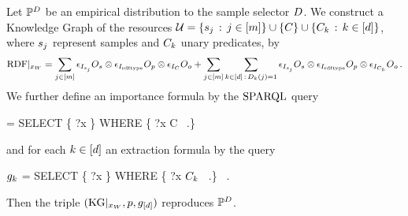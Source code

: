 \begin{theorem}
    \label{the:reproducingKGSingelObjects}
    Let $\mathbb{P}^{D}$ be an empirical distribution to the sample selector $D$.
    We construct a Knowledge Graph of the resources $\mathcal{U} = \{s_j \,:\, j\in[m]\} \cup \{C\} \cup \{C_k \,:\, k\in[d]\}$, where $s_{j}$ represent samples and $C_k$ unary predicates, by
    \begin{align*}
        {\mathrm{RDF}}|_{x_{W}}
        =
        \sum_{j\in[m]}
        \epsilon_{I_{s_j}}{O_{s}}
        \otimes \epsilon_{I_{\mathrm{rdf}\mathrm{type}}}{O_{p}}
        \otimes \epsilon_{I_{C}}{O_{o}}
        +
        \sum_{j\in[m]} \sum_{k\in[d] \,:\, D_{k}(j)=1}
        \epsilon_{I_{s_j}}{O_{s}}
        \otimes \epsilon_{I_{\mathrm{rdf}\mathrm{type}}}{O_{p}}
        \otimes \epsilon_{I_{C_k}}{O_{o}} \, .
    \end{align*}
    We further define an importance formula by the $\mathrm{SPARQL}$ query
    \begin{centeredscript}
        \impformula = SELECT \{ ?x \} WHERE \{ ?x \quad \rdftype\quad C \, .\}
    \end{centeredscript}
    and for each $k\in[d]$ an extraction formula by the query
    \begin{centeredscript}
        $g_{k}$ = SELECT \{ ?x \} WHERE \{ ?x \quad \rdftype \quad $C_k$ \, .\} \, .
    \end{centeredscript}
    Then the triple $(\mathrm{KG}|_{x_{W}},p,g_{[d]})$ reproduces $\mathbb{P}^{D}$.
\end{theorem}

